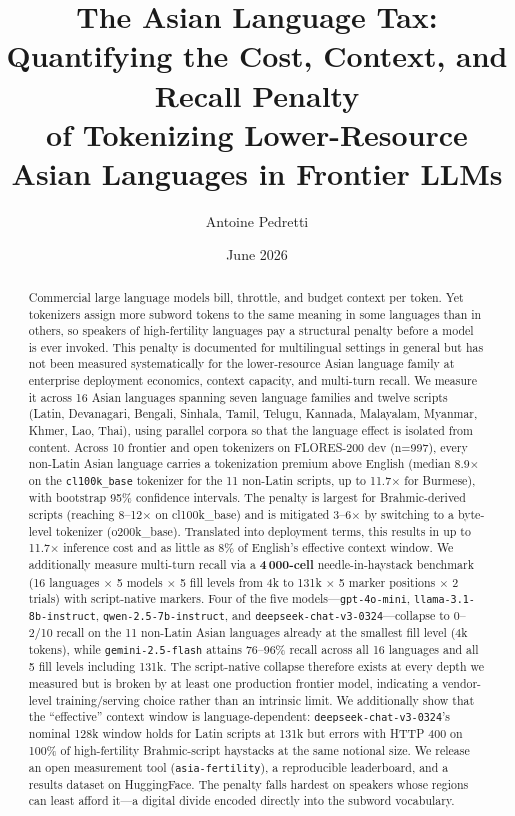 \documentclass[11pt,a4paper]{article}
\title{\textbf{The Asian Language Tax: Quantifying the Cost, Context, and Recall Penalty\\ of Tokenizing Lower-Resource Asian Languages in Frontier LLMs}}
\author{Antoine Pedretti}
\date{June 2026}
\begin{document}
\maketitle

\begin{abstract}
Commercial large language models bill, throttle, and budget context per token. Yet tokenizers assign more subword tokens to the same meaning in some languages than in others, so speakers of high-fertility languages pay a structural penalty before a model is ever invoked. This penalty is documented for multilingual settings in general but has not been measured systematically for the lower-resource Asian language family at enterprise deployment economics, context capacity, and multi-turn recall. We measure it across 16 Asian languages spanning seven language families and twelve scripts (Latin, Devanagari, Bengali, Sinhala, Tamil, Telugu, Kannada, Malayalam, Myanmar, Khmer, Lao, Thai), using parallel corpora so that the language effect is isolated from content. Across 10 frontier and open tokenizers on FLORES-200 dev (n=997), every non-Latin Asian language carries a tokenization premium above English (median 8.9$\times$ on the \texttt{cl100k\_base} tokenizer for the 11 non-Latin scripts, up to 11.7$\times$ for Burmese), with bootstrap 95\% confidence intervals. The penalty is largest for Brahmic-derived scripts (reaching 8--12$\times$ on cl100k\_base) and is mitigated 3--6$\times$ by switching to a byte-level tokenizer (o200k\_base). Translated into deployment terms, this results in up to 11.7$\times$ inference cost and as little as 8\% of English's effective context window. We additionally measure multi-turn recall via a \textbf{4\,000-cell} needle-in-haystack benchmark (16 languages $\times$ 5 models $\times$ 5 fill levels from 4k to 131k $\times$ 5 marker positions $\times$ 2 trials) with script-native markers. Four of the five models---\texttt{gpt-4o-mini}, \texttt{llama-3.1-8b-instruct}, \texttt{qwen-2.5-7b-instruct}, and \texttt{deepseek-chat-v3-0324}---collapse to 0--2/10 recall on the 11 non-Latin Asian languages already at the smallest fill level (4k tokens), while \texttt{gemini-2.5-flash} attains 76--96\% recall across all 16 languages and all 5 fill levels including 131k. The script-native collapse therefore exists at every depth we measured but is broken by at least one production frontier model, indicating a vendor-level training/serving choice rather than an intrinsic limit. We additionally show that the ``effective'' context window is language-dependent: \texttt{deepseek-chat-v3-0324}'s nominal 128k window holds for Latin scripts at 131k but errors with HTTP 400 on 100\% of high-fertility Brahmic-script haystacks at the same notional size. We release an open measurement tool (\texttt{asia-fertility}), a reproducible leaderboard, and a results dataset on HuggingFace. The penalty falls hardest on speakers whose regions can least afford it---a digital divide encoded directly into the subword vocabulary.
\end{abstract}
\end{document}

